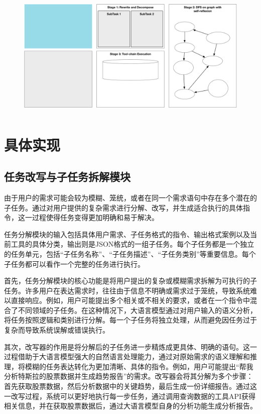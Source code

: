 \begin{figure}[!htp]
  \vspace{1em}
  \centering
  \setlength{\abovecaptionskip}{10pt} %
  \includegraphics[height=6cm]{../assets/ch3-1.pdf}
  \label{fig:ch4-framework}
\end{figure}

\section{具体实现}

\subsection{任务改写与子任务拆解模块}

由于用户的需求可能会较为模糊、笼统，或者在同一个需求语句中存在多个潜在的子任务。通过对用户提供的复杂需求进行分解、改写，并生成适合执行的具体指令，这一过程使得任务变得更加明确和易于解决。

任务分解模块的输入包括具体用户需求、子任务格式的指令、输出格式案例以及当前工具的具体分类，输出则是JSON格式的一组子任务。每个子任务都是一个独立的任务单元，包括“子任务名称”、“子任务描述”、“子任务类别”等重要信息。每个子任务都可以看作一个完整的任务进行执行。

首先，任务分解模块的核心功能是将用户提出的复杂或模糊需求拆解为可执行的子任务。许多用户在表达需求时，往往由于信息不明确或需求过于笼统，导致系统难以直接响应。例如，用户可能提出多个相关或不相关的要求，或者在一个指令中混合了不同领域的子任务。在这种情况下，大语言模型通过对用户输入的语义分析，将任务按照逻辑和类别进行分解。每一个子任务将独立处理，从而避免因任务过于复杂而导致系统误解或错误执行。

其次，改写器的作用是将分解后的子任务进一步精炼成更具体、明确的语句。这一过程借助于大语言模型强大的自然语言处理能力，通过对原始需求的语义理解和推理，将模糊的任务表达转化为更加清晰、具体的指令。例如，用户可能提出“帮我分析特斯拉的股票数据并生成趋势报告”的需求。改写器会将其分解为多个步骤：首先获取股票数据，然后分析数据中的关键趋势，最后生成一份详细报告。通过这一改写过程，系统可以更好地执行每一步任务，通过调用查询数据的工具API获得相关信息，并在获取股票数据后，通过大语言模型自身的分析功能生成分析报告。


